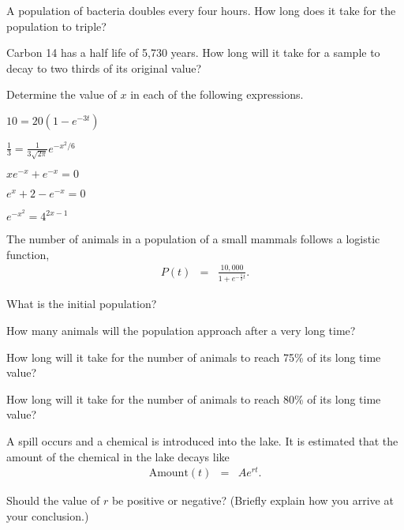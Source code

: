 \begin{problem}
\item A population of bacteria doubles every four hours. How long does
  it take for the population to triple?
  \vfill
\item Carbon 14 has a half life of 5,730 years. How long will it take
  for a sample to decay to two thirds of its original value?
  \vfill
\clearpage

\item Determine the value of $x$ in each of the following expressions.
  \begin{subproblem}
  \item $10 = 20\left( 1 - e^{-3t} \right)$
    \vfill
  \item $\frac{1}{3} =  \frac{1}{3\sqrt{2\pi}} e^{-x^2/6}$
    \vfill
  \item $xe^{-x} + e^{-x} = 0$
    \vfill
    \clearpage
  \item $e^{x} + 2 - e^{-x} = 0$
    \vfill
  \item $e^{-x^2} = 4^{2x-1}$
    \vfill
  \end{subproblem}

  \clearpage

\item The number of animals in a population of a small mammals follows
  a logistic function,
  \begin{eqnarray*}
    P(t) & = & \frac{10,000}{1+e^{-\frac{1}{2}t}}.
  \end{eqnarray*}
  \begin{subproblem}
  \item What is the initial population?
    \vspace{4em}
  \item How many animals will the population approach after a very
    long time?  
    \vspace{4em}
  \item How long will it take for the number of animals to reach 75\%
    of its long time value?
    \vfill
  \item How long will it take for the number of animals to reach 80\%
    of its long time value?
    \vfill
  \end{subproblem}

\clearpage

\item A spill occurs and a chemical is introduced into the lake. It is
  estimated that the amount of the chemical in the lake decays like
  \begin{eqnarray*}
    \mathrm{Amount}(t) & = & A e^{rt}.
  \end{eqnarray*}
  \begin{subproblem}
  \item Should the value of $r$ be positive or negative? (Briefly
    explain how you arrive at your conclusion.)  
    \vspace{5em}


\end{subproblem}
\end{problem}
